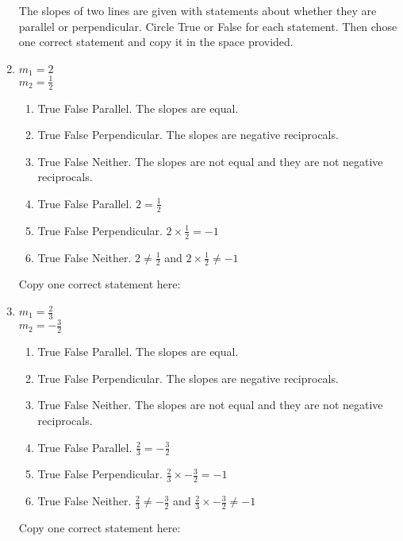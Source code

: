 \documentclass[12pt, twoside]{article}
\begin{document}
\begin{enumerate}
\newpage
  The slopes of two lines are given with statements about whether they are parallel or perpendicular. Circle True or False for each statement. Then chose one correct statement and copy it in the space provided.
  \item \begin{multicols}{2}
    $\displaystyle m_1=2$ \\
    $\displaystyle m_2=\frac{1}{2}$
  \end{multicols}
    \begin{enumerate}[leftmargin=!,labelindent=-0.5cm,itemindent=-2.9cm,itemsep=0.25cm]
      \item True \quad False \quad Parallel. The slopes are equal.
      \item True \quad False \quad Perpendicular. The slopes are  negative reciprocals.
      \item True \quad False \quad Neither. The slopes are not equal and they are not negative reciprocals.
      \item True \quad False \quad Parallel. $\displaystyle 2= \frac{1}{2}$
      \item True \quad False \quad Perpendicular. $\displaystyle 2 \times \frac{1}{2}= -1$
      \item True \quad False \quad Neither. $\displaystyle 2 \neq \frac{1}{2}$ and $\displaystyle 2 \times \frac{1}{2} \neq -1$
    \end{enumerate}
    Copy one correct statement here: \vspace{2cm}
  \item \begin{multicols}{2}
    $\displaystyle m_1=\frac{2}{3}$ \\
    $\displaystyle m_2=-\frac{3}{2}$
  \end{multicols}
    \begin{enumerate}[leftmargin=!,labelindent=-0.5cm,itemindent=-2.9cm,itemsep=0.25cm]
      \item True \quad False \quad Parallel. The slopes are equal.
      \item True \quad False \quad Perpendicular. The slopes are  negative reciprocals.
      \item True \quad False \quad Neither. The slopes are not equal and they are not negative reciprocals.
      \item True \quad False \quad Parallel. $\displaystyle \frac{2}{3}=-\frac{3}{2}$
      \item True \quad False \quad Perpendicular. $\displaystyle \frac{2}{3} \times -\frac{3}{2}= -1$
      \item True \quad False \quad Neither. $\displaystyle \frac{2}{3} \neq -\frac{3}{2}$ and $\displaystyle \frac{2}{3} \times -\frac{3}{2} \neq -1$
    \end{enumerate}
    Copy one correct statement here:


\end{enumerate}
\end{document}
